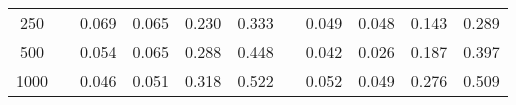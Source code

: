 % 
\begin{tabular}{ccccccccccc}
  \hline
  \hline
250 &  & 0.069 & 0.065 & 0.230 & 0.333 &  & 0.049 & 0.048 & 0.143 & 0.289 \\ 
  500 &  & 0.054 & 0.065 & 0.288 & 0.448 &  & 0.042 & 0.026 & 0.187 & 0.397 \\ 
  1000 &  & 0.046 & 0.051 & 0.318 & 0.522 &  & 0.052 & 0.049 & 0.276 & 0.509 \\ 
   \hline
\end{tabular}
